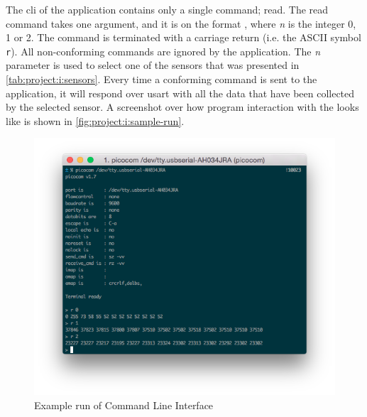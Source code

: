 The \gls{cli} of the application contains only a single command; read.
The read command takes one argument, and it is on the format , where \emph{n} is the integer 0, 1 or 2.
The command is terminated with a carriage return (i.e. the ASCII symbol \texttt{{}r}).
All non-conforming commands are ignored by the application.
The \emph{n} parameter is used to select one of the sensors that was presented in \autoref{tab:project:i:sensors}.
Every time a conforming command is sent to the application, it will respond over \gls{usart} with all the data that have been collected by the selected sensor.
A screenshot over how program interaction with the {\tracker} looks like is shown in \autoref{fig:project:i:sample-run}.

\begin{figure}[H]
  \begin{center}
    \includegraphics[width=\textwidth]{figures/sensortracker-cli}
  \end{center}
  \caption{Example run of Command Line Interface}
  \label{lst:project:i:sample-run}
\end{figure}
